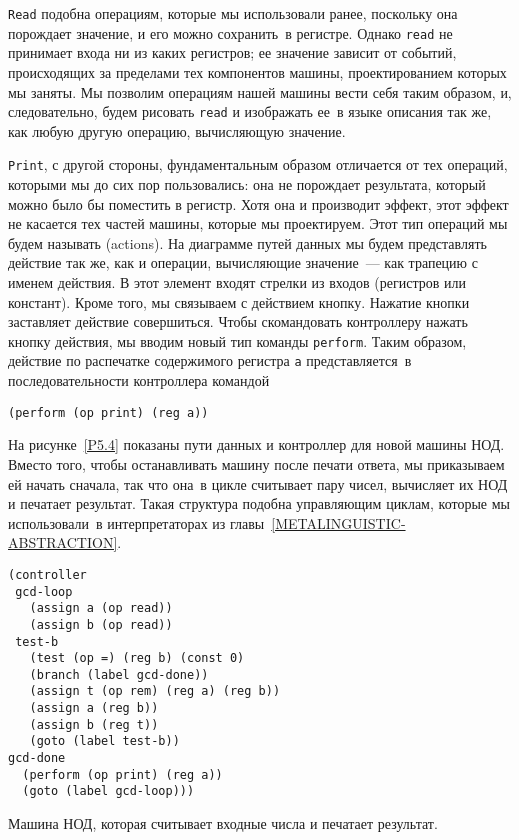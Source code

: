 {\tt Read} подобна операциям, которые мы 
использовали ранее, поскольку она порождает значение, и его можно
сохранить~в регистре.  Однако {\tt read} не принимает входа ни
из каких регистров; ее значение зависит от событий, происходящих за
пределами тех компонентов машины, проектированием которых мы заняты.
Мы позволим операциям нашей машины вести себя таким образом, и,
следовательно, будем рисовать {\tt read} и
изображать ее~в языке описания так же, как любую другую операцию,
вычисляющую значение.

{\tt Print}, с другой стороны, фундаментальным
образом отличается от тех операций, которыми мы до сих пор пользовались:
она не порождает результата, который можно было бы поместить
в регистр.  Хотя она и производит эффект, этот эффект не касается тех
частей машины, которые мы проектируем.  Этот тип операций мы будем
называть  (actions).  На диаграмме путей
данных мы будем представлять действие так же, как и операции,
вычисляющие значение~--- как трапецию с именем действия.  В этот
элемент входят стрелки из входов (регистров или констант).  Кроме
того, мы связываем с действием кнопку.  Нажатие кнопки заставляет
действие совершиться.  Чтобы скомандовать контроллеру нажать кнопку
действия, мы вводим новый тип команды {\tt perform}.
Таким образом, действие по распечатке содержимого регистра {\tt a}
представляется~в последовательности контроллера командой

\begin{Verbatim}[fontsize=\small]
(perform (op print) (reg a))
\end{Verbatim}

На рисунке~\ref{P5.4} показаны пути данных и
контроллер для новой машины НОД.  Вместо того, чтобы останавливать
машину после печати ответа, мы приказываем ей начать сначала, так что
она~в цикле считывает пару чисел, вычисляет их НОД и печатает
результат.  Такая структура подобна управляющим циклам, которые мы
использовали~в интерпретаторах из главы~\ref{METALINGUISTIC-ABSTRACTION}.


\begin{cntrfig}

\begin{Verbatim}[fontsize=\small]
(controller
 gcd-loop
   (assign a (op read))
   (assign b (op read))
 test-b
   (test (op =) (reg b) (const 0)
   (branch (label gcd-done))
   (assign t (op rem) (reg a) (reg b))
   (assign a (reg b))
   (assign b (reg t))
   (goto (label test-b))
gcd-done
  (perform (op print) (reg a))
  (goto (label gcd-loop)))
\end{Verbatim}
\caption{Машина НОД, которая считывает входные числа и
печатает результат.}
\label{P5.4}

\end{cntrfig}

